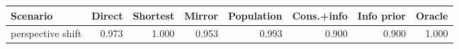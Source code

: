 \begin{tabular}{lrrrrrrr}
\toprule
Scenario & Direct & Shortest & Mirror & Population & Cons.+info & Info prior & Oracle \\
\midrule
perspective shift & 0.973 & 1.000 & 0.953 & 0.993 & 0.900 & 0.900 & 1.000 \\
\bottomrule
\end{tabular}
